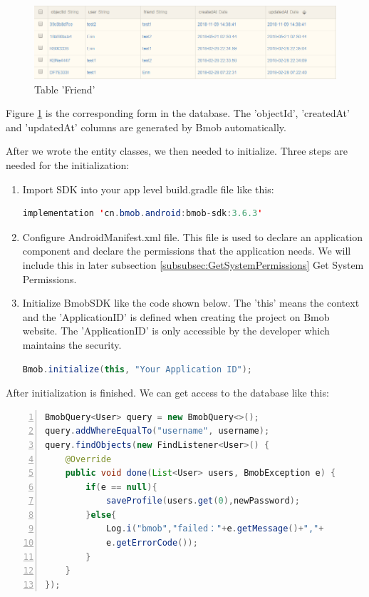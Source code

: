 \begin{figure}[htb]
\centering
\includegraphics[width=1\textwidth]{section04/assets/databaseOverview.png}
\caption[Table 'Friend']{\label{DatabseOverview}Table 'Friend'}
\end{figure}
\par Figure \ref{DatabseOverview} is the corresponding form in the database. The {\ttfamily 'objectId', 'createdAt'} and {\ttfamily 'updatedAt'} columns are generated by Bmob automatically. 
\par After we wrote the entity classes, we then needed to initialize. Three steps are needed for the initialization: 
\begin{enumerate}
\item[1)]Import SDK into your app level build.gradle file like this:
\begin{lstlisting}[language={java},
        basicstyle=\footnotesize\ttfamily,xleftmargin=.1\textwidth, xrightmargin=.2\textwidth]
implementation 'cn.bmob.android:bmob-sdk:3.6.3'
\end{lstlisting} 
\item[2)] Configure {\ttfamily AndroidManifest.xml} file. This file is used to declare an application component and declare the permissions that the application needs. We will include this in later subsection \ref{subsubsec:GetSystemPermissions} Get System Permissions.
\item[3)] Initialize BmobSDK like the code shown below. The {\ttfamily 'this'} means the context and the {\ttfamily 'ApplicationID'}  is defined when creating the project on Bmob website. The {\ttfamily 'ApplicationID'} is only accessible by the developer which maintains the security.
\begin{lstlisting}[language={java},
        basicstyle=\footnotesize\ttfamily,xleftmargin=.1\textwidth, xrightmargin=.2\textwidth]
Bmob.initialize(this, "Your Application ID");
\end{lstlisting} 
\end{enumerate}
\par After initialization is finished. We can get access to the database like this:
\begin{lstlisting}[language={java},
        numbers=left,basicstyle=\footnotesize\ttfamily,xleftmargin=.15\textwidth, xrightmargin=.2\textwidth]
BmobQuery<User> query = new BmobQuery<>();
query.addWhereEqualTo("username", username);
query.findObjects(new FindListener<User>() {
    @Override
    public void done(List<User> users, BmobException e) {
        if(e == null){
            saveProfile(users.get(0),newPassword);
        }else{
            Log.i("bmob","failed："+e.getMessage()+","+
            e.getErrorCode());
        }
    }
});
\end{lstlisting} 
